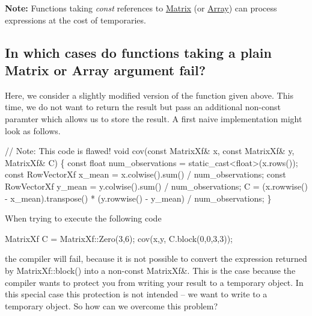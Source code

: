 {\bfseries Note\+:} Functions taking {\itshape const} references to \hyperlink{group___core___module_class_eigen_1_1_matrix}{Matrix} (or \hyperlink{group___core___module_class_eigen_1_1_array}{Array}) can process expressions at the cost of temporaries.\hypertarget{_topic_function_taking_eigen_types_TopicPlainFunctionsFailing}{}\subsection{In which cases do functions taking a plain Matrix or Array argument fail?}\label{_topic_function_taking_eigen_types_TopicPlainFunctionsFailing}
Here, we consider a slightly modified version of the function given above. This time, we do not want to return the result but pass an additional non-\/const paramter which allows us to store the result. A first naive implementation might look as follows. 
\begin{DoxyCode}
\textcolor{comment}{// Note: This code is flawed!}
\textcolor{keywordtype}{void} cov(\textcolor{keyword}{const} MatrixXf& x, \textcolor{keyword}{const} MatrixXf& y, MatrixXf& C)
\{
  \textcolor{keyword}{const} \textcolor{keywordtype}{float} num\_observations = \textcolor{keyword}{static\_cast<}\textcolor{keywordtype}{float}\textcolor{keyword}{>}(x.rows());
  \textcolor{keyword}{const} RowVectorXf x\_mean = x.colwise().sum() / num\_observations;
  \textcolor{keyword}{const} RowVectorXf y\_mean = y.colwise().sum() / num\_observations;
  C = (x.rowwise() - x\_mean).transpose() * (y.rowwise() - y\_mean) / num\_observations;
\}
\end{DoxyCode}
 When trying to execute the following code 
\begin{DoxyCode}
MatrixXf C = MatrixXf::Zero(3,6);
cov(x,y, C.block(0,0,3,3));
\end{DoxyCode}
 the compiler will fail, because it is not possible to convert the expression returned by {\ttfamily Matrix\+Xf\+::block()} into a non-\/const {\ttfamily Matrix\+Xf\&}. This is the case because the compiler wants to protect you from writing your result to a temporary object. In this special case this protection is not intended -- we want to write to a temporary object. So how can we overcome this problem?

